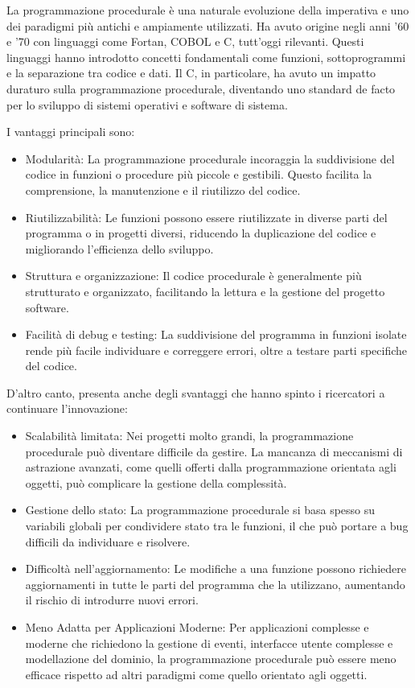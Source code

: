 \documentclass[
  letterpaper,
]{scrbook}
\begin{document}
La programmazione procedurale è una naturale evoluzione della imperativa
e uno dei paradigmi più antichi e ampiamente utilizzati. Ha avuto
origine negli anni '60 e '70 con linguaggi come Fortan, COBOL e C,
tutt'oggi rilevanti. Questi linguaggi hanno introdotto concetti
fondamentali come funzioni, sottoprogrammi e la separazione tra codice e
dati. Il C, in particolare, ha avuto un impatto duraturo sulla
programmazione procedurale, diventando uno standard de facto per lo
sviluppo di sistemi operativi e software di sistema.

I vantaggi principali sono:

\begin{itemize}
\item
  Modularità: La programmazione procedurale incoraggia la suddivisione
  del codice in funzioni o procedure più piccole e gestibili. Questo
  facilita la comprensione, la manutenzione e il riutilizzo del codice.
\item
  Riutilizzabilità: Le funzioni possono essere riutilizzate in diverse
  parti del programma o in progetti diversi, riducendo la duplicazione
  del codice e migliorando l'efficienza dello sviluppo.
\item
  Struttura e organizzazione: Il codice procedurale è generalmente più
  strutturato e organizzato, facilitando la lettura e la gestione del
  progetto software.
\item
  Facilità di debug e testing: La suddivisione del programma in funzioni
  isolate rende più facile individuare e correggere errori, oltre a
  testare parti specifiche del codice.
\end{itemize}

D'altro canto, presenta anche degli svantaggi che hanno spinto i
ricercatori a continuare l'innovazione:

\begin{itemize}
\item
  Scalabilità limitata: Nei progetti molto grandi, la programmazione
  procedurale può diventare difficile da gestire. La mancanza di
  meccanismi di astrazione avanzati, come quelli offerti dalla
  programmazione orientata agli oggetti, può complicare la gestione
  della complessità.
\item
  Gestione dello stato: La programmazione procedurale si basa spesso su
  variabili globali per condividere stato tra le funzioni, il che può
  portare a bug difficili da individuare e risolvere.
\item
  Difficoltà nell'aggiornamento: Le modifiche a una funzione possono
  richiedere aggiornamenti in tutte le parti del programma che la
  utilizzano, aumentando il rischio di introdurre nuovi errori.
\item
  Meno Adatta per Applicazioni Moderne: Per applicazioni complesse e
  moderne che richiedono la gestione di eventi, interfacce utente
  complesse e modellazione del dominio, la programmazione procedurale
  può essere meno efficace rispetto ad altri paradigmi come quello
  orientato agli oggetti.
\end{itemize}
\end{document}
